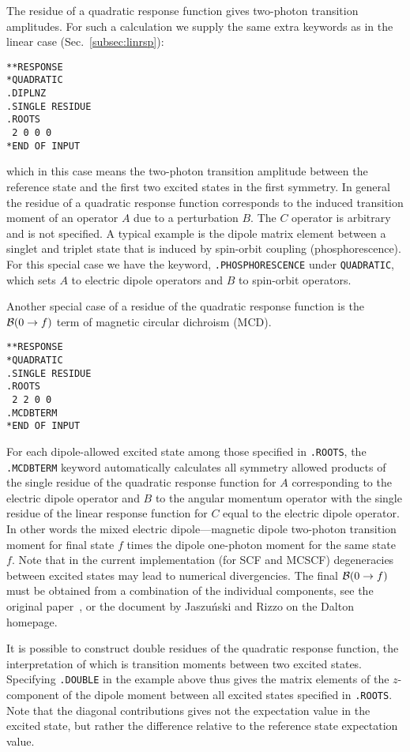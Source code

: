The residue of a quadratic response function gives two-photon
transition amplitudes. For such a
calculation we supply the same extra 
keywords as in the linear case (Sec.~\ref{subsec:linrsp}):
\begin{verbatim}
**RESPONSE
*QUADRATIC
.DIPLNZ
.SINGLE RESIDUE
.ROOTS
 2 0 0 0
*END OF INPUT
\end{verbatim}
which in this case means the two-photon transition
amplitude between the
reference state and the first two excited states in the first symmetry.  In
general the residue of a quadratic response function corresponds to the
induced transition moment of an operator $A$ due to a perturbation $B$.
The $C$ operator is arbitrary and is not specified.  A typical example is
the dipole matrix element between a singlet and triplet state that is
induced by spin-orbit coupling
(phosphorescence). For this special case we 
have the keyword, {\tt .PHOSPHORESCENCE} under {\tt *QUADRATIC}, which sets
$A$ to electric dipole operators and $B$ to spin-orbit operators.

Another special case of a residue of the quadratic response function 
is the ${\cal{B}}(0\to f)$ term of magnetic circular dichroism (MCD).
\begin{verbatim}
**RESPONSE
*QUADRATIC
.SINGLE RESIDUE
.ROOTS
 2 2 0 0
.MCDBTERM
*END OF INPUT
\end{verbatim}
For each dipole-allowed excited state among those specified in 
{\tt .ROOTS}, the {\tt .MCDBTERM} keyword automatically 
calculates all symmetry allowed products of the single residue of the 
quadratic response function for $A$ corresponding to the electric dipole
operator and $B$ to the angular momentum operator with the single residue 
of the linear response function for $C$ equal to the electric dipole operator.
In other words the mixed electric dipole---magnetic dipole two-photon transition moment 
for final state $f$ times the dipole one-photon moment for the same state $f$.
Note that in the current implementation (for SCF and MCSCF) degeneracies between
excited states may lead to numerical divergencies. 
The final ${\cal{B}}(0\to f)$ must be obtained from a combination 
of the individual components, see the original paper~\cite{Coriani:MCDRSP},
or the document by Jaszu\'{n}ski and Rizzo on the Dalton
homepage. 

It is possible to construct double
residues of the quadratic
response function, the interpretation of which is transition
moments
between two 
excited states. Specifying {\tt .DOUBLE} in the example above thus gives
the matrix elements of the $z$-component of the dipole moment between
all excited states specified in {\tt .ROOTS}. Note that the diagonal contributions
gives  not the expectation value in the excited state, but rather the
difference relative to the reference state expectation value.


